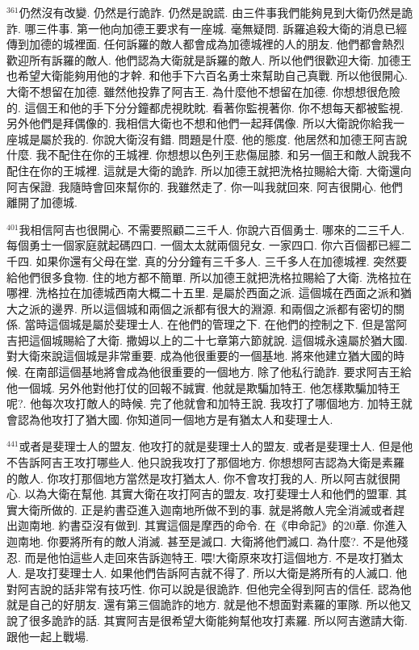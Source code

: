 \documentclass{book}
\begin{document}
$^{361}$仍然沒有改變.
仍然是行詭詐.
仍然是說謊.
由三件事我們能夠見到大衛仍然是詭詐.
哪三件事.
第一他向加德王要求有一座城.
毫無疑問.
訴羅追殺大衛的消息已經傳到加德的城裡面.
任何訴羅的敵人都會成為加德城裡的人的朋友.
他們都會熱烈歡迎所有訴羅的敵人.
他們認為大衛就是訴羅的敵人.
所以他們很歡迎大衛.
加德王也希望大衛能夠用他的才幹.
和他手下六百名勇士來幫助自己真戰.
所以他很開心.
大衛不想留在加德.
雖然他投靠了阿吉王.
為什麼他不想留在加德.
你想想很危險的.
這個王和他的手下分分鐘都虎視眈眈.
看著你監視著你.
你不想每天都被監視.
另外他們是拜偶像的.
我相信大衛也不想和他們一起拜偶像.
所以大衛說你給我一座城是屬於我的.
你說大衛沒有錯.
問題是什麼.
他的態度.
他居然和加德王阿吉說什麼.
我不配住在你的王城裡.
你想想以色列王悲傷屈膝.
和另一個王和敵人說我不配住在你的王城裡.
這就是大衛的詭詐.
所以加德王就把洗格拉賜給大衛.
大衛還向阿吉保證.
我隨時會回來幫你的.
我雖然走了.
你一叫我就回來.
阿吉很開心.
他們離開了加德城.

$^{401}$我相信阿吉也很開心.
不需要照顧二三千人.
你說六百個勇士.
哪來的二三千人.
每個勇士一個家庭就起碼四口.
一個太太就兩個兒女.
一家四口.
你六百個都已經二千四.
如果你還有父母在堂.
真的分分鐘有三千多人.
三千多人在加德城裡.
突然要給他們很多食物.
住的地方都不簡單.
所以加德王就把洗格拉賜給了大衛.
洗格拉在哪裡.
洗格拉在加德城西南大概二十五里.
是屬於西面之派.
這個城在西面之派和猶大之派的邊界.
所以這個城和兩個之派都有很大的淵源.
和兩個之派都有密切的關係.
當時這個城是屬於斐理士人.
在他們的管理之下.
在他們的控制之下.
但是當阿吉把這個城賜給了大衛.
撒姆以上的二十七章第六節就說.
這個城永遠屬於猶大國.
對大衛來說這個城是非常重要.
成為他很重要的一個基地.
將來他建立猶大國的時候.
在南部這個基地將會成為他很重要的一個地方.
除了他私行詭詐.
要求阿吉王給他一個城.
另外他對他打仗的回報不誠實.
他就是欺騙加特王.
他怎樣欺騙加特王呢?.
他每次攻打敵人的時候.
完了他就會和加特王說.
我攻打了哪個地方.
加特王就會認為他攻打了猶大國.
你知道同一個地方是有猶太人和斐理士人.

$^{441}$或者是斐理士人的盟友.
他攻打的就是斐理士人的盟友.
或者是斐理士人.
但是他不告訴阿吉王攻打哪些人.
他只說我攻打了那個地方.
你想想阿吉認為大衛是素羅的敵人.
你攻打那個地方當然是攻打猶太人.
你不會攻打我的人.
所以阿吉就很開心.
以為大衛在幫他.
其實大衛在攻打阿吉的盟友.
攻打斐理士人和他們的盟軍.
其實大衛所做的.
正是約書亞進入迦南地所做不到的事.
就是將敵人完全消滅或者趕出迦南地.
約書亞沒有做到.
其實這個是摩西的命令.
在《申命記》的20章.
你進入迦南地.
你要將所有的敵人消滅.
甚至是滅口.
大衛將他們滅口.
為什麼?.
不是他殘忍.
而是他怕這些人走回來告訴迦特王.
喂!大衛原來攻打這個地方.
不是攻打猶太人.
是攻打斐理士人.
如果他們告訴阿吉就不得了.
所以大衛是將所有的人滅口.
他對阿吉說的話非常有技巧性.
你可以說是很詭詐.
但他完全得到阿吉的信任.
認為他就是自己的好朋友.
還有第三個詭詐的地方.
就是他不想面對素羅的軍隊.
所以他又說了很多詭詐的話.
其實阿吉是很希望大衛能夠幫他攻打素羅.
所以阿吉邀請大衛.
跟他一起上戰場.
\end{document}
